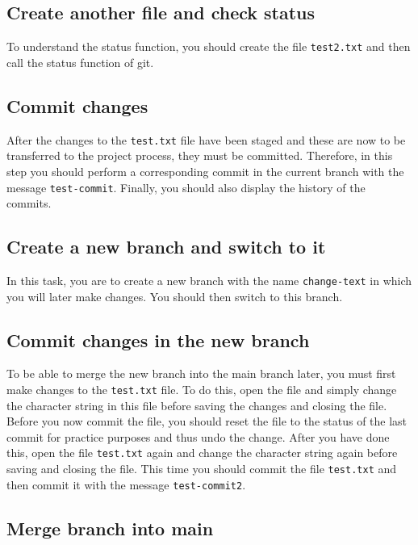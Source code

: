 \documentclass[
  letterpaper,
  DIV=11,
  numbers=noendperiod]{scrreprt}
\begin{document}
\subsection{Create another file and check
status}\label{create-another-file-and-check-status}

To understand the status function, you should create the file
\texttt{test2.txt} and then call the status function of git.

\subsection{Commit changes}\label{commit-changes}

After the changes to the \texttt{test.txt} file have been staged and
these are now to be transferred to the project process, they must be
committed. Therefore, in this step you should perform a corresponding
commit in the current branch with the message \texttt{test-commit}.
Finally, you should also display the history of the commits.

\subsection{Create a new branch and switch to
it}\label{create-a-new-branch-and-switch-to-it}

In this task, you are to create a new branch with the name
\texttt{change-text} in which you will later make changes. You should
then switch to this branch.

\subsection{Commit changes in the new
branch}\label{commit-changes-in-the-new-branch}

To be able to merge the new branch into the main branch later, you must
first make changes to the \texttt{test.txt} file. To do this, open the
file and simply change the character string in this file before saving
the changes and closing the file. Before you now commit the file, you
should reset the file to the status of the last commit for practice
purposes and thus undo the change. After you have done this, open the
file \texttt{test.txt} again and change the character string again
before saving and closing the file. This time you should commit the file
\texttt{test.txt} and then commit it with the message
\texttt{test-commit2}.

\subsection{Merge branch into main}\label{merge-branch-into-main}
\end{document}
